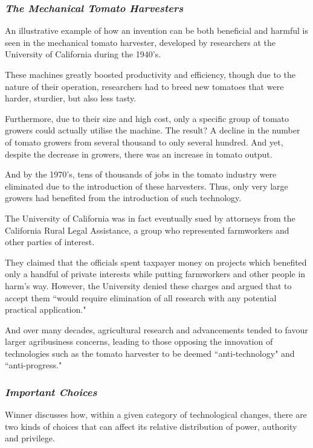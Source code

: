 \documentclass[openany]{book}
\begin{document}
\subsubsection{\textit{The Mechanical Tomato Harvesters}}
\begin{example}
	An illustrative example of how an invention can be both beneficial and harmful is seen in the mechanical tomato harvester, developed by researchers at the University of California during the 1940's.
	
	These machines greatly boosted productivity and efficiency, though due to the nature of their operation, researchers had to breed new tomatoes that were harder, sturdier, but also less tasty.
	
	Furthermore, due to their size and high cost, only a specific group of tomato growers could actually utilise the machine. The result? A decline in the number of tomato growers from several thousand to only several hundred. And yet, despite the decrease in growers, there was an increase in tomato output.
	
	And by the 1970's, tens of thousands of jobs in the tomato industry were eliminated due to the introduction of these harvesters. Thus, only very large growers had benefited from the introduction of such technology.
\end{example}

The University of California was in fact eventually sued by attorneys from the California Rural Legal Assistance, a group who represented farmworkers and other parties of interest.

They claimed that the officials spent taxpayer money on projects which benefited only a handful of private interests while putting farmworkers and other people in harm's way. However, the University denied these charges and argued that to accept them ``would require elimination of all research with any potential practical application."

And over many decades, agricultural research and advancements tended to favour larger agribusiness concerns, leading to those opposing the innovation of technologies such as the tomato harvester to be deemed ``anti-technology" and ``anti-progress."

\subsubsection{\textit{Important Choices}}
Winner discusses how, within a given category of technological changes, there are two kinds of choices that can affect its relative distribution of power, authority and privilege.
\end{document}
